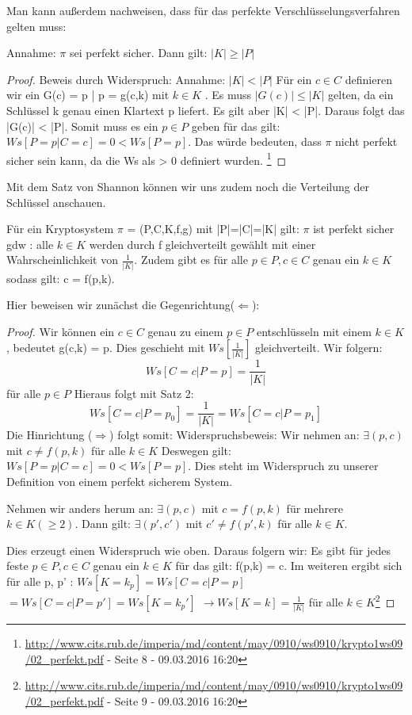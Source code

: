 \documentclass[
10pt, %
a4paper, %
oneside, %
headinclude,footinclude, %
BCOR5mm, %
]{scrartcl}
\begin{document}
Man kann außerdem nachweisen, dass für das perfekte Verschlüsselungsverfahren gelten muss: 
\begin{satz}
Annahme: $\pi$ sei perfekt sicher. Dann gilt: $|K| \ge |P| $
\end{satz}
\begin{proof}
Beweis durch Widerspruch: 
Annahme: $|K| < |P| $
Für ein $c \in C$ definieren wir ein G(c) = {p | p = g(c,k) mit $k \in K$ }.
Es muss $|G(c)| \le |K|$ gelten, da ein Schlüssel k genau einen Klartext p liefert.  
Es gilt aber |K| < |P|. Daraus folgt das |G(c)| < |P|. Somit muss es ein $p \in P$ geben für das gilt: $Ws[\textit{P} = p | \textit{C} = c] = 0 < Ws[\textit{P} = p] $.
Das würde bedeuten, dass $\pi$ nicht perfekt sicher sein kann, da die Ws als > 0 definiert wurden. \footnote{\url{http://www.cits.rub.de/imperia/md/content/may/0910/ws0910/krypto1ws09/02_perfekt.pdf} - Seite 8 - 09.03.2016 16:20 }
\end{proof}
Mit dem Satz von Shannon können wir uns zudem noch die Verteilung der Schlüssel anschauen. 
\begin{satz} 
[Shannon]
Für ein Kryptosystem $\pi$ = (P,C,K,f,g) mit |P|=|C|=|K| gilt: $\pi$ ist perfekt sicher gdw : alle $k \in K$ werden durch f gleichverteilt gewählt mit einer Wahrscheinlichkeit von $ \frac{1}{|K|} $. Zudem gibt es für alle $p \in P, c \in C$ genau ein $k \in K $ sodass gilt: c = f(p,k).
\end{satz}
Hier beweisen wir zunächst die Gegenrichtung($\Leftarrow$): 
\begin{proof}
Wir können ein $ c \in C$ genau zu einem $p \in P$ entschlüsseln mit einem $k \in K $, bedeutet g(c,k) = p. Dies geschieht mit $Ws[\frac{1}{|K|}] $ gleichverteilt. Wir folgern: 
$$Ws[\textit{C} = c | \textit{P} = p] = \frac{1}{|K|}$$ für alle $p \in P$ 
Hieraus folgt mit Satz 2: 
$$Ws[\textit{C} = c | \textit{P} = p_0] = \frac{1}{|K|} = Ws[\textit{C} = c | \textit{P} = p_1]$$
Die Hinrichtung ($\Rightarrow$) folgt somit:
Widerspruchsbeweis:
Wir nehmen an: $\exists (p,c)$ mit $c \ne f(p,k)$ für alle $k \in K $
Deswegen gilt: $Ws[\textit{P} = p | \textit{C} = c] = 0 < Ws[\textit{P} = p]$. Dies steht im Widerspruch zu unserer Definition von einem perfekt sicherem System.
 
Nehmen wir anders herum an: $\exists (p,c)$ mit $c = f(p,k)$ für mehrere $k \in K (\ge 2) $.
Dann gilt: $\exists (p',c')$ mit $c' \ne f(p',k)$ für alle $k \in K $.
 
Dies erzeugt einen Widerspruch wie oben. 
Daraus folgern wir: Es gibt für jedes feste $p \in P, c \in C$ genau ein $k \in K$ für das gilt: f(p,k) = c. 
Im weiteren ergibt sich für alle p, p' : 
$Ws[\textit{K} = k_p] = Ws[\textit{C} = c | \textit{P} = p]$
$ = Ws[\textit{C} = c | \textit{P} = p'] = Ws[\textit{K} = k_p']$
$\rightarrow Ws[\textit{K} = k ] = \frac{1}{|K|}$ für alle $k \in K $\footnote{\url{http://www.cits.rub.de/imperia/md/content/may/0910/ws0910/krypto1ws09/02_perfekt.pdf} - Seite 9 - 09.03.2016 16:20 }
\end{proof}
\end{document}
